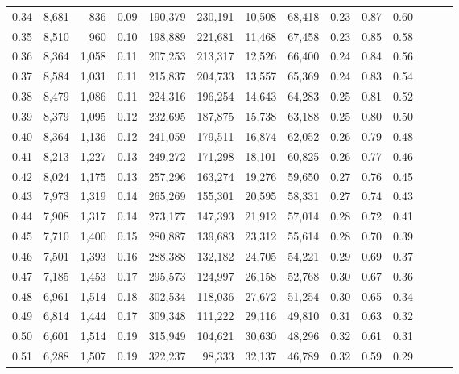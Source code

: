\begin{tabular}{rrrrrrrrrrrrrr}
0.34 &   8,681 &    836 &  0.09 &  190,379 &  230,191 &  10,508 &  68,418 &  0.23 &  0.87 &      0.60 \\
0.35 &   8,510 &    960 &  0.10 &  198,889 &  221,681 &  11,468 &  67,458 &  0.23 &  0.85 &      0.58 \\
0.36 &   8,364 &  1,058 &  0.11 &  207,253 &  213,317 &  12,526 &  66,400 &  0.24 &  0.84 &      0.56 \\
0.37 &   8,584 &  1,031 &  0.11 &  215,837 &  204,733 &  13,557 &  65,369 &  0.24 &  0.83 &      0.54 \\
0.38 &   8,479 &  1,086 &  0.11 &  224,316 &  196,254 &  14,643 &  64,283 &  0.25 &  0.81 &      0.52 \\
0.39 &   8,379 &  1,095 &  0.12 &  232,695 &  187,875 &  15,738 &  63,188 &  0.25 &  0.80 &      0.50 \\
0.40 &   8,364 &  1,136 &  0.12 &  241,059 &  179,511 &  16,874 &  62,052 &  0.26 &  0.79 &      0.48 \\
0.41 &   8,213 &  1,227 &  0.13 &  249,272 &  171,298 &  18,101 &  60,825 &  0.26 &  0.77 &      0.46 \\
0.42 &   8,024 &  1,175 &  0.13 &  257,296 &  163,274 &  19,276 &  59,650 &  0.27 &  0.76 &      0.45 \\
0.43 &   7,973 &  1,319 &  0.14 &  265,269 &  155,301 &  20,595 &  58,331 &  0.27 &  0.74 &      0.43 \\
0.44 &   7,908 &  1,317 &  0.14 &  273,177 &  147,393 &  21,912 &  57,014 &  0.28 &  0.72 &      0.41 \\
0.45 &   7,710 &  1,400 &  0.15 &  280,887 &  139,683 &  23,312 &  55,614 &  0.28 &  0.70 &      0.39 \\
0.46 &   7,501 &  1,393 &  0.16 &  288,388 &  132,182 &  24,705 &  54,221 &  0.29 &  0.69 &      0.37 \\
0.47 &   7,185 &  1,453 &  0.17 &  295,573 &  124,997 &  26,158 &  52,768 &  0.30 &  0.67 &      0.36 \\
0.48 &   6,961 &  1,514 &  0.18 &  302,534 &  118,036 &  27,672 &  51,254 &  0.30 &  0.65 &      0.34 \\
0.49 &   6,814 &  1,444 &  0.17 &  309,348 &  111,222 &  29,116 &  49,810 &  0.31 &  0.63 &      0.32 \\
0.50 &   6,601 &  1,514 &  0.19 &  315,949 &  104,621 &  30,630 &  48,296 &  0.32 &  0.61 &      0.31 \\
0.51 &   6,288 &  1,507 &  0.19 &  322,237 &   98,333 &  32,137 &  46,789 &  0.32 &  0.59 &      0.29 \\

\end{tabular}
